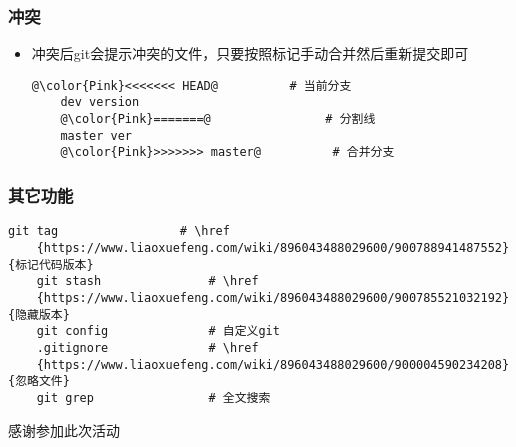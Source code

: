 \begin{CJK}{UTF8}{gbsn}
\begin{frame} [fragile]
	\frametitle{冲突}
	\linespread{1.5}
	\begin{itemize}
	\item 冲突后git会提示冲突的文件，只要按照标记手动合并然后重新提交即可
	\begin{lstlisting}[basicstyle=\ttfamily, gobble=4, texcl, escapechar=@]
	@\color{Pink}<<<<<<< HEAD@			# 当前分支
	dev version
	@\color{Pink}=======@				 # 分割线
	master ver
	@\color{Pink}>>>>>>> master@		  # 合并分支
	\end{lstlisting}
	\end{itemize}
\end{frame}

\begin{frame} [fragile]
	\frametitle{其它功能}
	\linespread{1.5}
	\begin{lstlisting}[style=bashstyle, gobble=4, texcl, escapechar=@]
	git tag					# \href
	{https://www.liaoxuefeng.com/wiki/896043488029600/900788941487552}{标记代码版本}
	git stash				# \href
	{https://www.liaoxuefeng.com/wiki/896043488029600/900785521032192}{隐藏版本}
	git config				# 自定义git
	.gitignore				# \href
	{https://www.liaoxuefeng.com/wiki/896043488029600/900004590234208}{忽略文件}
	git grep				# 全文搜索
	\end{lstlisting}
\end{frame}

\PreLastFrame
\begin{frame}
	\centerline{\fontsize{32}{32}\selectfont 感谢参加此次活动}
\end{frame}

\newpage
\end{CJK}



